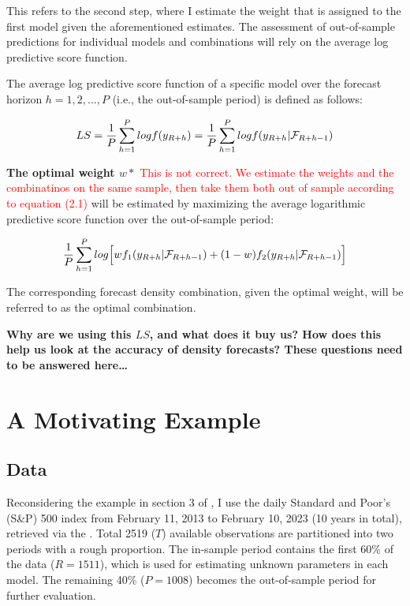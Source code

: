 \documentclass{monashthesis}
\begin{document}
This refers to the second step, where I estimate the weight that is assigned to the first model given the aforementioned estimates. The assessment of out-of-sample predictions for individual models and combinations will rely on the average log predictive score function.

The average log predictive score function of a specific model over the forecast horizon \(h=1,2,...,P\) (i.e., the out-of-sample period) is defined as follows:

\begin{equation}
LS = \frac{1}{P}\sum^P_{h=1}logf(y_{\small{R+h}}) = \frac{1}{P}\sum^P_{h=1} logf(y_{\small{R+h}}| \mathcal{F}_{\small{R+h-1}})
\end{equation}

\textbf{The optimal weight \(w*\) } \textcolor{red}{This is not correct. We estimate the weights and the combinatinos on the same sample, then take them both out of sample according to equation (2.1)} will be estimated by maximizing the average logarithmic predictive score function over the out-of-sample period:

\begin{equation}
\frac{1}{P}\sum^P_{h=1}log\Big[wf_1(y_{\small{R+h}}|\mathcal{F}_{\small{R+h-1}}) + (1-w)f_2(y_{\small{R+h}}|\mathcal{F}_{\small{R+h-1}})\Big]
\end{equation}

The corresponding forecast density combination, given the optimal weight, will be referred to as the optimal combination.

\textbf{Why are we using this \(LS\), and what does it buy us? How does this help us look at the accuracy of density forecasts? These questions need to be answered here\ldots{}}

\hypertarget{a-motivating-example}{%
\section{A Motivating Example}\label{a-motivating-example}}

\hypertarget{data}{%
\subsection{Data}\label{data}}

Reconsidering the example in section 3 of \textcite{GA11}, I use the daily Standard and Poor's (S\&P) 500 index from February 11, 2013 to February 10, 2023 (10 years in total), retrieved via the \textcite{SP500}. Total 2519 (\(T\)) available observations are partitioned into two periods with a rough proportion. The in-sample period contains the first 60\% of the data (\(R = 1511\)), which is used for estimating unknown parameters in each model. The remaining 40\% (\(P = 1008\)) becomes the out-of-sample period for further evaluation.
\end{document}

